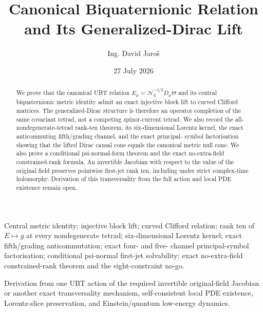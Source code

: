 \documentclass[11pt,a4paper]{article}
\title{Canonical Biquaternionic Relation and Its Generalized-Dirac Lift}
\author{Ing. David Jaro\v{s}}
\date{27 July 2026}
\begin{document}
\maketitle
\begin{abstract}
We prove that the canonical UBT relation
$E_\mu=\mathcal N_0^{-1/2}D_\mu\Theta$ and its central biquaternionic metric
identity admit an exact injective block lift to curved Clifford matrices.
The generalized-Dirac structure is therefore an operator completion of the
same covariant tetrad, not a competing spinor-current tetrad.  We also record
the all-nondegenerate-tetrad rank-ten theorem, its six-dimensional Lorentz
kernel, the exact anticommuting fifth/grading channel, and the exact principal-
symbol factorisation showing that the lifted Dirac causal cone equals the
canonical metric null cone.  We also prove a conditional psi-normal-form theorem and the exact
no-extra-field constrained-rank formula.  An invertible Jacobian with respect
to the value of the original field preserves pointwise first-jet rank ten,
including under strict complex-time holomorphy.  Derivation of this
transversality from the full action and local PDE existence remain open.
\end{abstract}



\begin{tcolorbox}[colback=green!5!white,colframe=green!60!black,title=Proved]
Central metric identity; injective block lift; curved Clifford relation;
rank ten of $E\mapsto g$ at every nondegenerate tetrad; six-dimensional
Lorentz kernel; exact fifth/grading anticommutation; exact four- and five-
channel principal-symbol factorisation; conditional psi-normal first-jet
solvability; exact no-extra-field constrained-rank theorem and the
eight-constraint no-go.
\end{tcolorbox}

\begin{tcolorbox}[colback=yellow!7!white,colframe=orange!70!black,title=Open]
Derivation from one UBT action of the required invertible original-field
Jacobian or another exact transversality mechanism, self-consistent local PDE
existence, Lorentz-slice preservation, and Einstein/quantum low-energy
dynamics.
\end{tcolorbox}
\end{document}
